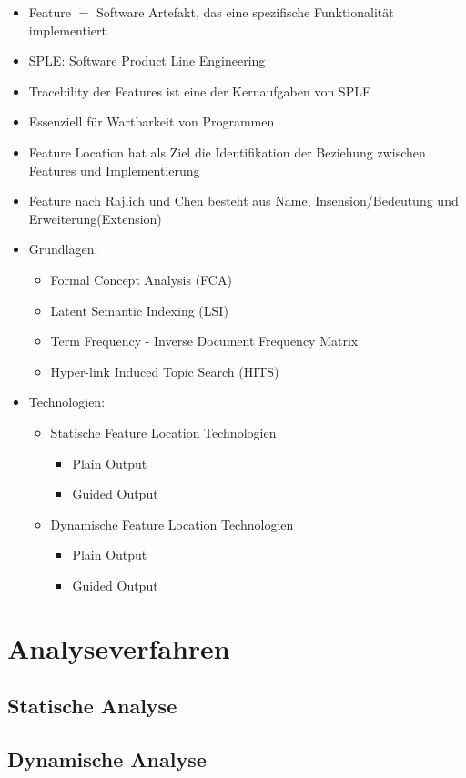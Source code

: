 \documentclass[runningheads,a4paper]{llncs}
\begin{document}
\begin{itemize}
	\item Feature $=$ Software Artefakt, das eine spezifische Funktionalität implementiert
	\item SPLE: Software Product Line Engineering
	\item Tracebility der Features ist eine der Kernaufgaben von SPLE
	\item Essenziell für Wartbarkeit von Programmen
	\item Feature Location hat als Ziel die Identifikation der Beziehung zwischen Features und Implementierung
	\item Feature nach Rajlich und Chen besteht aus Name, Insension/Bedeutung und Erweiterung(Extension)
	\item Grundlagen:
	\begin{itemize}
		\item Formal Concept Analysis (FCA)
		\item Latent Semantic Indexing (LSI)
		\item Term Frequency - Inverse Document Frequency Matrix
		\item Hyper-link Induced Topic Search (HITS)
	\end{itemize}
	\item Technologien:
	\begin{itemize}
		\item Statische Feature Location Technologien
		\begin{itemize}
			\item Plain Output
			\item Guided Output
		\end{itemize}
		\item Dynamische Feature Location Technologien
		\begin{itemize}
			\item Plain Output
			\item Guided Output	
		\end{itemize}
	\end{itemize}
\end{itemize}

\section{Analyseverfahren}
\subsection{Statische Analyse}
\subsection{Dynamische Analyse}
\end{document}
